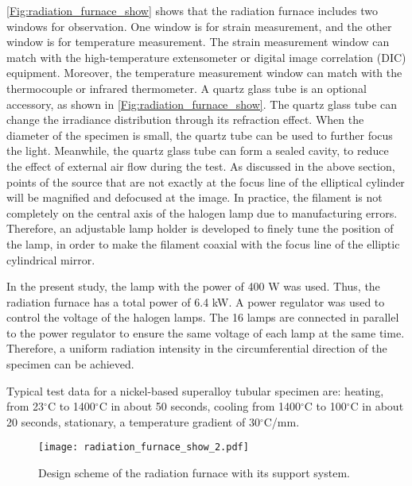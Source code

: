 \ref{Fig:radiation_furnace_show} shows that the radiation furnace includes two windows for observation. One window is for strain measurement, and the other window is for temperature measurement. 
The strain measurement window can match with the high-temperature extensometer or digital image correlation (DIC) equipment.
Moreover, the temperature measurement window can match with the thermocouple or infrared thermometer.
A quartz glass tube is an optional accessory, as shown in \ref{Fig:radiation_furnace_show}. The quartz glass tube can change the irradiance distribution through its refraction effect. When the diameter of the specimen is small, the quartz tube can be used to further focus the light. Meanwhile, the quartz glass tube can form a sealed cavity, to reduce the effect of external air flow during the test. As discussed in the above section, points of the source that are not exactly at the focus line of the elliptical cylinder will be magnified and defocused at the image. In practice, the filament is not completely on the central axis of the halogen lamp due to manufacturing errors. Therefore, an adjustable lamp holder is developed to finely tune the position of the lamp, in order to make the filament coaxial with the focus line of the elliptic cylindrical mirror.

In the present study, the lamp with the power of 400 W was used. Thus, the radiation furnace has a total power of 6.4 kW. A power regulator was used to control the voltage of the halogen lamps. The 16 lamps are connected in parallel to the power regulator to ensure the same voltage of each lamp at the same time. Therefore, a uniform radiation intensity in the circumferential direction of the specimen can be achieved.

Typical test data for a nickel-based superalloy tubular specimen are: heating, from 23$^\circ$C to 1400$^\circ$C in about 50 seconds, cooling from 1400$^\circ$C to 100$^\circ$C in about 20 seconds, stationary, a temperature gradient of 30$^\circ$C/mm.




\begin{figure}[!htp]
	\centering
	\texttt{[image: radiation\_furnace\_show\_2.pdf]}
	\caption{Design scheme of the radiation furnace with its support system.}
	\label{Fig:radiation_furnace_show_2}
\end{figure}

